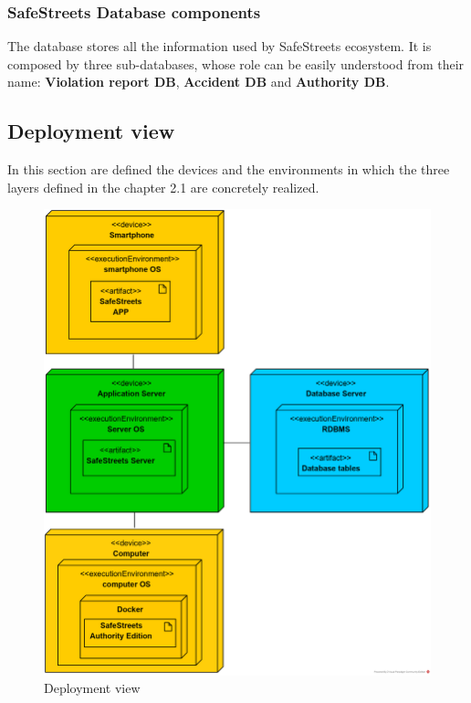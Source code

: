 \documentclass{article}
\begin{document}
		\subsubsection{SafeStreets Database components}
		The database stores all the information used by SafeStreets ecosystem. It is composed by three sub-databases, whose role can be easily understood from their name: \textbf{Violation report DB}, \textbf{Accident DB} and \textbf{Authority DB}.
		
		\clearpage
		\subsection{Deployment view}
		In this section are defined the devices and the environments in which the three layers defined in the chapter 2.1 are concretely realized.
		
		\begin{figure}[H]
			\centering
			\includegraphics [scale=0.8] {diagrams/deployment_view.png}
			\caption[Deployment View]{Deployment view}
			\label{fig:deployment_view}
		\end{figure}
	
\end{document}
